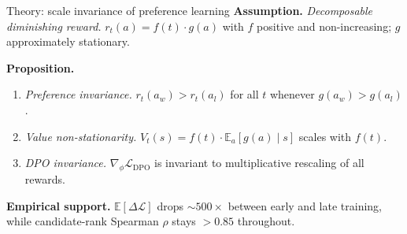 \documentclass[aspectratio=169,10pt]{beamer}
\begin{document}
\begin{frame}{Theory: scale invariance of preference learning}
\textbf{Assumption.} \emph{Decomposable diminishing reward.}
$r_t(a) = f(t)\cdot g(a)$ with $f$ positive and non-increasing; $g$ approximately stationary.
\medskip

\textbf{Proposition.}
\begin{enumerate}
\item \emph{Preference invariance.} $r_t(a_w)\!>\!r_t(a_l)$ for all $t$ whenever $g(a_w)\!>\!g(a_l)$.
\item \emph{Value non-stationarity.} $V_t(s)=f(t)\cdot\mathbb{E}_a[g(a)\mid s]$ scales with $f(t)$.
\item \emph{DPO invariance.} $\nabla_\phi \mathcal{L}_\text{DPO}$ is invariant to multiplicative
      rescaling of all rewards.
\end{enumerate}
\medskip

\textbf{Empirical support.} $\mathbb{E}[\Delta\mathcal{L}]$ drops $\sim\!500\times$ between
early and late training, while candidate-rank Spearman $\rho$ stays $>0.85$ throughout.
\end{frame}
\end{document}
